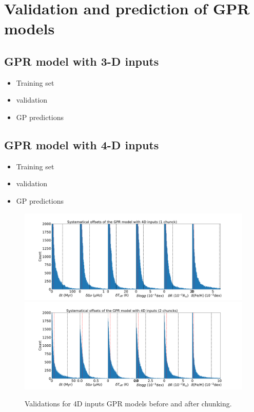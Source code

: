 \section{Validation and prediction of GPR models }

\subsection{GPR model with 3-D inputs}
\begin{itemize}
\item Training set 
\item validation 
\item GP predictions
\end{itemize}



\subsection{GPR model with 4-D inputs}
\begin{itemize}
\item Training set 
\item validation 
\item GP predictions
\end{itemize}

\begin{figure}
	\includegraphics[width=1.0\columnwidth]{4d_validation_x.pdf}
	\includegraphics[width=1.0\columnwidth]{4d_2chunks_validation_x.pdf}
    \caption{Validations for 4D inputs GPR models before and after chunking.}
    \label{fig:4d_vali1}
\end{figure}


